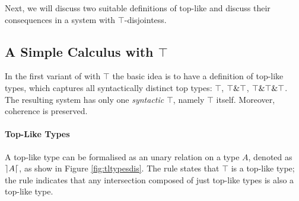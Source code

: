 
Next, we will discuss two suitable definitions of top-like and discuss their consequences in a system with
$\top$-disjointess.



\subsection{A Simple Calculus with $\top$}\label{subsec:simpletop}

In the first variant of \name with $\top$ the basic idea is to have a 
definition of top-like types, which captures all syntactically
distinct top types:  $\top$, $\top \& \top$, $\top \& \top
\& \top$. The resulting system has only one \emph{syntactic}
$\top$, namely $\top$ itself. Moreover, coherence is preserved.

\paragraph{Top-Like Types}


A top-like type can be formalised as an unary relation on a type $A$, denoted as $\rceil A \lceil$, as show in 
Figure \ref{fig:tltypesdis}.
The rule  states that $\top$ is a top-like type; 
the rule  indicates that any 
intersection composed of just top-like types is also a top-like type.

